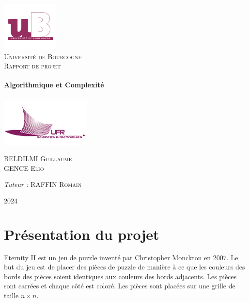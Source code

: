 \documentclass[12pt, openany]{report}
\begin{document}
\begin{titlepage}
  \begin{sffamily}
  \begin{center}
    \includegraphics[scale=1]{img/logo-ub.png}~\\[1.5cm]
    \textsc{\LARGE Université de Bourgogne}\\[2cm]
    \textsc{\Large Rapport de projet}\\[1.5cm]
    \HRule \\[0.4cm]
    { \huge \bfseries Algorithmique et Complexité\\[0.4cm] }
    \HRule \\[2cm]
    \includegraphics[scale=1]{img/logo-ufr.png}
    \\[2cm]
    \begin{minipage}{0.4\textwidth}
      \begin{flushleft} \large
        BELDILMI \textsc{Guillaume}\\
        GENCE \textsc{Elio}\\
      \end{flushleft}
    \end{minipage}
    \begin{minipage}{0.4\textwidth}
      \begin{flushright} \large
        \emph{Tuteur :} RAFFIN \textsc{Romain}\\
      \end{flushright}
    \end{minipage}
    \vfill
    {\large 2024}
  \end{center}
  \end{sffamily}
\end{titlepage}
\section*{Présentation du projet}

Eternity II est un jeu de puzzle inventé par Christopher Monckton en
2007. Le but du jeu est de placer des pièces de puzzle de manière à
ce que les couleurs des bords des pièces soient identiques aux
couleurs des bords adjacents.  Les pièces sont carrées et chaque
côté est coloré. Les pièces sont placées sur une grille de taille
$n \times n$.
\end{document}
